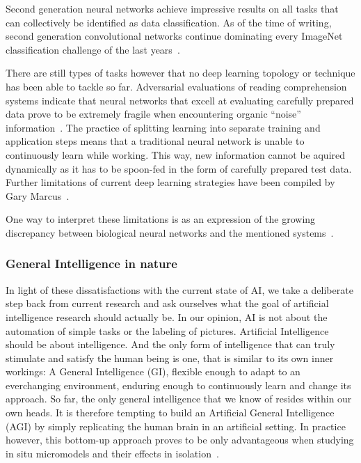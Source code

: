 Second generation neural networks achieve impressive results
on all tasks that can collectively be identified as data classification.
As of the time of writing, second generation convolutional networks
continue dominating every ImageNet classification challenge of the last
years~\cite{ILSVRC15}.

There are still types of tasks however that no deep learning topology or 
technique has been able to tackle so far. Adversarial evaluations of reading comprehension
systems indicate that neural networks that excell at evaluating carefully
prepared data prove to be extremely fragile when encountering organic ``noise''
information~\cite{DBLP:journals/corr/JiaL17}.
The practice of splitting learning into separate training and application steps
means that a traditional neural network is unable to continuously learn while working.
This way, new information cannot be aquired dynamically as it has to be spoon-fed in the
form of carefully prepared test data.
Further limitations of current deep learning strategies have been compiled by 
Gary Marcus~\cite{DBLP:journals/corr/abs-1801-00631}.

One way to interpret these limitations is as an expression of the growing discrepancy between
biological neural networks and the mentioned systems~\cite{Paugam-Moisy2012}.

\subsubsection{General Intelligence in nature}
In light of these dissatisfactions with the current state of AI, we take a deliberate step back 
from current research and ask ourselves what the goal of artificial intelligence research should actually be.
In our opinion, AI is not about the automation of simple tasks or the labeling of pictures. 
Artificial Intelligence should be about intelligence. And the only form of intelligence that can truly
stimulate and satisfy the human being is one, that is similar to its own inner workings: A General Intelligence (GI),
flexible enough to adapt to an everchanging environment, enduring enough to continuously learn and change its approach.
So far, the only general intelligence that we know of resides within our own heads. It is therefore tempting to
build an Artificial General Intelligence (AGI) by simply replicating the human brain in an artificial setting. In practice
however, this bottom-up approach proves to be only advantageous when studying in situ micromodels and 
their effects in isolation~\cite{Dudai2014}. 

